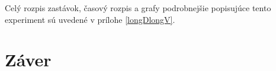 Celý rozpis zastávok, časový rozpis a grafy podrobnejšie popisujúce tento experiment sú uvedené v prílohe \ref{longDlongV}.

\chapter{Záver} %
\label{zaver}






































